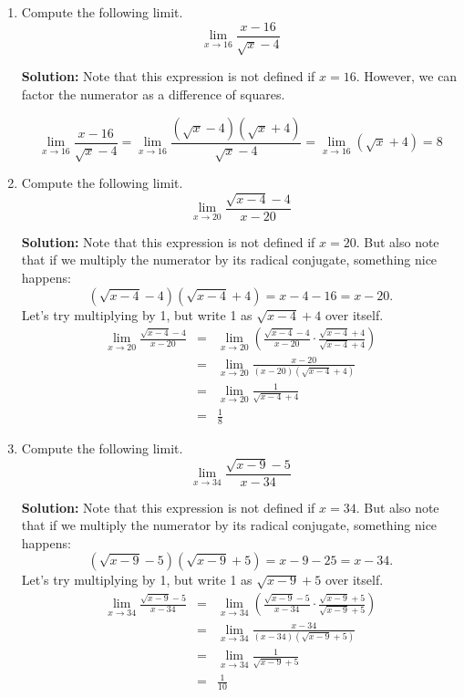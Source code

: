 \documentclass{article}
\begin{document}
\begin{enumerate}
  
\vspace{1cm}

\item Compute the following limit. \[ \lim_{x \rightarrow 16} \frac{x - 16}{\sqrt{x} - 4} \]

\textbf{Solution:} Note that this expression is not defined if $x = 16$. However, we can factor the numerator as a difference of squares.

\[ \lim_{x \rightarrow 16} \frac{x - 16}{\sqrt{x} - 4} = \lim_{x \rightarrow 16} \frac{(\sqrt{x} - 4)(\sqrt{x} + 4)}{\sqrt{x} - 4} = \lim_{x \rightarrow 16} (\sqrt{x} + 4) = 8 \]


  
\vspace{1cm}

\item Compute the following limit. \[ \lim_{x \rightarrow 20} \frac{\sqrt{x - 4} - 4}{x - 20} \]

\textbf{Solution:} Note that this expression is not defined if $x = 20$. But also note that if we multiply the numerator by its radical conjugate, something nice happens:
\[ \left(\sqrt{x - 4} - 4\right)\left(\sqrt{x - 4} + 4\right) = x - 4 - 16 = x - 20. \]
Let's try multiplying by 1, but write 1 as $\sqrt{x - 4} + 4$ over itself.
\begin{eqnarray*}
\lim_{x \rightarrow 20} \frac{\sqrt{x - 4} - 4}{x - 20} & = & \lim_{x \rightarrow 20} \left( \frac{\sqrt{x - 4} - 4}{x - 20} \cdot \frac{\sqrt{x - 4} + 4}{\sqrt{x - 4} + 4} \right) \\
 & = & \lim_{x \rightarrow 20} \frac{x - 20}{(x - 20)(\sqrt{x - 4} + 4)} \\
 & = & \lim_{x \rightarrow 20} \frac{1}{\sqrt{x - 4} + 4} \\
 & = & \frac{1}{8}
\end{eqnarray*}


  
\vspace{1cm}

\item Compute the following limit. \[ \lim_{x \rightarrow 34} \frac{\sqrt{x - 9} - 5}{x - 34} \]

\textbf{Solution:} Note that this expression is not defined if $x = 34$. But also note that if we multiply the numerator by its radical conjugate, something nice happens:
\[ \left(\sqrt{x - 9} - 5\right)\left(\sqrt{x - 9} + 5\right) = x - 9 - 25 = x - 34. \]
Let's try multiplying by 1, but write 1 as $\sqrt{x - 9} + 5$ over itself.
\begin{eqnarray*}
\lim_{x \rightarrow 34} \frac{\sqrt{x - 9} - 5}{x - 34} & = & \lim_{x \rightarrow 34} \left( \frac{\sqrt{x - 9} - 5}{x - 34} \cdot \frac{\sqrt{x - 9} + 5}{\sqrt{x - 9} + 5} \right) \\
 & = & \lim_{x \rightarrow 34} \frac{x - 34}{(x - 34)(\sqrt{x - 9} + 5)} \\
 & = & \lim_{x \rightarrow 34} \frac{1}{\sqrt{x - 9} + 5} \\
 & = & \frac{1}{10}
\end{eqnarray*}



\end{enumerate}
\end{document}
